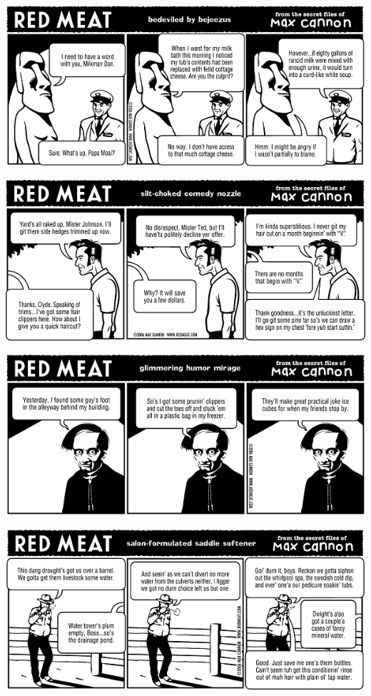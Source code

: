 \documentclass[a4paper,twoside,11pt]{article}
\begin{document}
\includegraphics[width=\textwidth]{redmeat_2006-04-11.png}



\includegraphics[width=\textwidth]{redmeat_2006-04-18.png}



\includegraphics[width=\textwidth]{redmeat_2006-04-25.png}



\includegraphics[width=\textwidth]{redmeat_2006-05-02.png}
\end{document}
